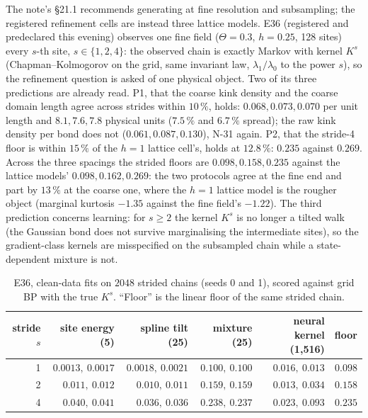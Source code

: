 \documentclass[10pt,a4paper]{article}
\newcommand{\Th}{\Theta}
\theoremstyle{plain}
\theoremstyle{remark}
\begin{document}
The note's \S21.1 recommends generating at fine resolution and subsampling; the registered
refinement cells are instead three lattice models. E36 (registered and predeclared this evening)
observes one fine field ($\Th=0.3$, $h=0.25$, 128 sites) every $s$-th site, $s\in\{1,2,4\}$: the
observed chain is exactly Markov with kernel $K^s$ (Chapman--Kolmogorov on the grid, same invariant
law, $\lambda_1/\lambda_0$ to the power $s$), so the refinement question is asked of one physical
object. Two of its three predictions are already read. P1, that the coarse kink density and the
coarse domain length agree across strides within $10\,\%$, holds: $0.068,0.073,0.070$ per unit
length and $8.1,7.6,7.8$ physical units ($7.5\,\%$ and $6.7\,\%$ spread); the raw kink density per
bond does not ($0.061,0.087,0.130$), N-31 again. P2, that the stride-4 floor is within $15\,\%$ of the
$h=1$ lattice cell's, holds at $12.8\,\%$: $0.235$ against $0.269$. Across the three spacings the
strided floors are $0.098,0.158,0.235$ against the lattice models' $0.098,0.162,0.269$: the two
protocols agree at the fine end and part by $13\,\%$ at the coarse one, where the $h=1$ lattice model
is the rougher object (marginal kurtosis $-1.35$ against the fine field's $-1.22$). The third
prediction concerns learning: for $s\ge2$ the kernel $K^s$ is no longer a tilted walk (the Gaussian
bond does not survive marginalising the intermediate sites), so the gradient-class kernels are
misspecified on the subsampled chain while a state-dependent mixture is not.

\begin{table}[h]\centering\footnotesize
\caption{E36, clean-data fits on $2048$ strided chains (seeds 0 and 1), scored against grid BP with the true $K^s$.
``Floor'' is the linear floor of the same strided chain.}
\label{tab:stride}
\begin{tabular}{@{}rrrrrr@{}}
\toprule
stride $s$ & site energy (5) & spline tilt (25) & mixture (25) & neural kernel (1{,}516) & floor \\
\midrule
1 & $0.0013,\ 0.0017$ & $0.0018,\ 0.0021$ & $0.100,\ 0.100$ & $0.016,\ 0.013$ & $0.098$ \\
2 & $0.011,\ 0.012$ & $0.010,\ 0.011$ & $0.159,\ 0.159$ & $0.013,\ 0.034$ & $0.158$ \\
4 & $0.040,\ 0.041$ & $0.036,\ 0.036$ & $0.238,\ 0.237$ & $0.023,\ 0.093$ & $0.235$ \\
\bottomrule
\end{tabular}
\end{table}
\end{document}
